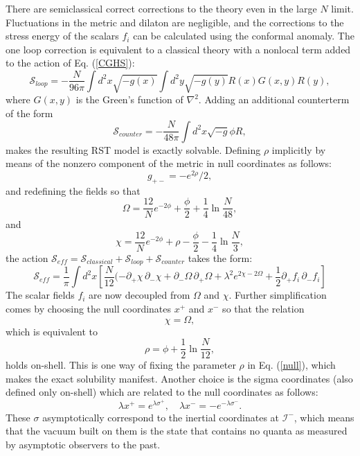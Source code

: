 \documentclass{article}
\begin{document}
There are semiclassical correct corrections to the theory even in the large $N$ limit.  Fluctuations in the metric and dilaton are negligible, and the corrections to the stress energy of the scalars $f_i$ can be calculated using the conformal anomaly.  The one loop correction is equivalent to a classical theory with a nonlocal term added to the action of Eq. (\ref{CGHS}):
\begin{equation}
\mathcal{S}_{loop} = -\frac{N}{96\pi}\int d^2x \sqrt{-g(x)} \int d^2y \sqrt{-g(y)}R(x)G(x,y)R(y),
\end{equation}
where $G(x,y)$ is the Green's function of $\nabla^2$.  Adding an additional counterterm of the form
\begin{equation}
\mathcal{S}_{counter} = -\frac{N}{48\pi} \int d^2x \sqrt{-g} \phi R,
\end{equation}
makes the resulting RST model is exactly solvable.  Defining $\rho$ implicitly by means of the nonzero component of the metric in null coordinates as follows:
\begin{equation}\label{null}
g_{+-} = -e^{2\rho}/2,
\end{equation}
and redefining the fields so that
\begin{equation}\label{Omega}
\Omega = \frac{12}{N}e^{-2\phi} + \frac{\phi}{2} + \frac{1}{4}\ln \frac{N}{48},
\end{equation}
and
\begin{equation}
\chi = \frac{12}{N}e^{-2\phi} + \rho - \frac{\phi}{2} - \frac{1}{4}\ln \frac{N}{3},
\end{equation}
the action 
$\mathcal{S}_{eff} = \mathcal{S}_{classical} + \mathcal{S}_{loop} + \mathcal{S}_{counter}$
takes the form:
\begin{equation}
\mathcal{S}_{eff} = \frac{1}{\pi} \int d^2x \left[
\frac{N}{12}(-\partial_{+}\chi\, \partial_{-}\chi + \partial_{-}\Omega\, \partial_{+}\Omega
+ \lambda^2 e^{2\chi - 2\Omega} + \frac{1}{2} \partial_{+}f_i\, \partial_{-}f_i \right]
\end{equation}
The scalar fields $f_i$ are now decoupled from $\Omega$ and $\chi$.  Further simplification comes by choosing the null coordinates $x^{+}$ and $x^{-}$ so that the relation
\begin{equation}\label{Kruskal}
\chi = \Omega,  
\end{equation}
which is equivalent to
\begin{equation}
\rho = \phi + \frac{1}{2}\ln\frac{N}{12},\end{equation}
holds on-shell.  This is one way of fixing the parameter $\rho$ in Eq. (\ref{null}), which makes the exact solubility manifest.  Another choice is the sigma coordinates (also defined only on-shell) which are related to the null coordinates as follows:
\begin{equation}
\lambda x^{+} = e^{\lambda \sigma^{+}},\quad \lambda x^{-} = -e^{-\lambda \sigma^{-}}.
\end{equation}
These $\sigma$ asymptotically correspond to the inertial coordinates at $\mathcal{I}^{-}$, which means that the vacuum built on them is the state that contains no quanta as measured by asymptotic observers to the past.
\end{document}
